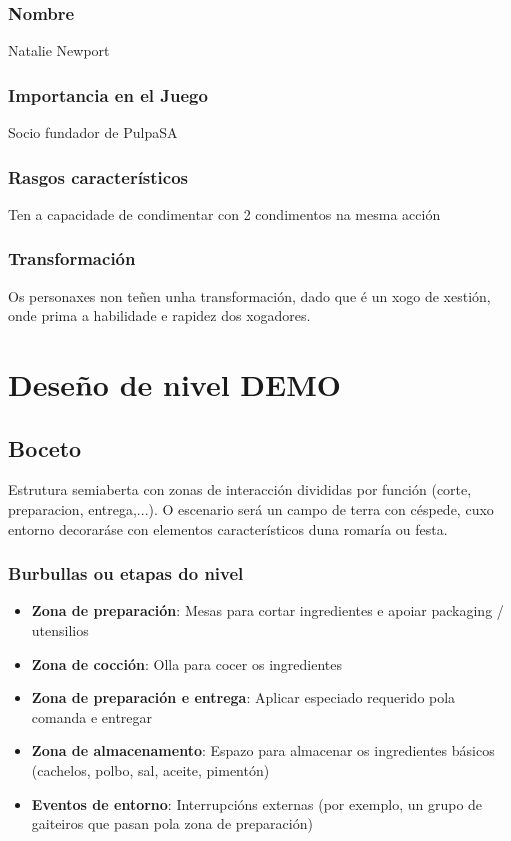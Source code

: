 \documentclass{report}  %
\begin{document}
\subsubsection{Nombre}
Natalie Newport
\subsubsection{Importancia en el Juego}
Socio fundador de PulpaSA \footnotemark[1]
\subsubsection{Rasgos característicos}
Ten a capacidade de condimentar con 2 condimentos na mesma acción \footnotemark[2]
\subsubsection{Transformación}
Os personaxes non teñen unha transformación, dado que é un xogo de xestión, onde prima a habilidade e rapidez dos xogadores.


\newpage
\section{Deseño de nivel DEMO}
\subsection{Boceto}
Estrutura semiaberta con zonas de interacción divididas por función (corte, preparacion, entrega,...). O escenario
será un campo de terra con céspede, cuxo entorno decoraráse con elementos característicos duna romaría ou festa.

\subsubsection{Burbullas ou etapas do nivel}
\begin{itemize}
    \item \textbf{Zona de preparación}: Mesas para cortar ingredientes e apoiar packaging / utensilios
    \item \textbf{Zona de cocción}: Olla para cocer os ingredientes
    \item \textbf{Zona de preparación e entrega}: Aplicar especiado requerido pola comanda e entregar
    \item \textbf{Zona de almacenamento}: Espazo para almacenar os ingredientes básicos (cachelos, polbo, sal, aceite, pimentón)
    \item \textbf{Eventos de entorno}: Interrupcións externas (por exemplo, un grupo de gaiteiros que pasan pola zona de preparación)
\end{itemize}
\end{document}
